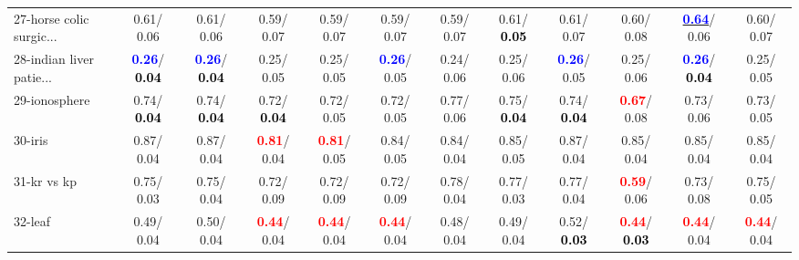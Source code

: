 \begin{table}[h]
\begin{center}
{\begin{tabular}{lc|c|c|c|c|c|c|c|c|c|c}
27-horse colic surgic... &   0.61/  0.06 &   0.61/  0.06 &   0.59/  0.07 &   0.59/  0.07 &   0.59/  0.07 &   0.59/  0.07 &   0.61/\textcolor{black}{\textbf{  0.05}} &   0.61/  0.07 &   0.60/  0.08 & \underline{\textcolor{blue}{\textbf{  0.64}}}/  0.06 &   0.60/  0.07 \\
28-indian liver patie... & \textcolor{blue}{\textbf{  0.26}}/\textcolor{black}{\textbf{  0.04}} & \textcolor{blue}{\textbf{  0.26}}/\textcolor{black}{\textbf{  0.04}} &   0.25/  0.05 &   0.25/  0.05 & \textcolor{blue}{\textbf{  0.26}}/  0.05 &   0.24/  0.06 &   0.25/  0.06 & \textcolor{blue}{\textbf{  0.26}}/  0.05 &   0.25/  0.06 & \textcolor{blue}{\textbf{  0.26}}/\textcolor{black}{\textbf{  0.04}} &   0.25/  0.05 \\ \hline
29-ionosphere &   0.74/\textcolor{black}{\textbf{  0.04}} &   0.74/\textcolor{black}{\textbf{  0.04}} &   0.72/\textcolor{black}{\textbf{  0.04}} &   0.72/  0.05 &   0.72/  0.05 &   0.77/  0.06 &   0.75/\textcolor{black}{\textbf{  0.04}} &   0.74/\textcolor{black}{\textbf{  0.04}} & \textcolor{red}{\textbf{  0.67}}/  0.08 &   0.73/  0.06 &   0.73/  0.05 \\
30-iris &   0.87/  0.04 &   0.87/  0.04 & \textcolor{red}{\textbf{  0.81}}/  0.04 & \textcolor{red}{\textbf{  0.81}}/  0.05 &   0.84/  0.05 &   0.84/  0.04 &   0.85/  0.05 &   0.87/  0.04 &   0.85/  0.04 &   0.85/  0.04 &   0.85/  0.04 \\
31-kr vs kp &   0.75/  0.03 &   0.75/  0.04 &   0.72/  0.09 &   0.72/  0.09 &   0.72/  0.09 &   0.78/  0.04 &   0.77/  0.03 &   0.77/  0.04 & \textcolor{red}{\textbf{  0.59}}/  0.06 &   0.73/  0.08 &   0.75/  0.05 \\
32-leaf &   0.49/  0.04 &   0.50/  0.04 & \textcolor{red}{\textbf{  0.44}}/  0.04 & \textcolor{red}{\textbf{  0.44}}/  0.04 & \textcolor{red}{\textbf{  0.44}}/  0.04 &   0.48/  0.04 &   0.49/  0.04 &   0.52/\textcolor{black}{\textbf{  0.03}} & \textcolor{red}{\textbf{  0.44}}/\textcolor{black}{\textbf{  0.03}} & \textcolor{red}{\textbf{  0.44}}/  0.04 & \textcolor{red}{\textbf{  0.44}}/  0.04 \\\end{tabular}}\label{stratsALCKappa0besta}
\end{center}
\end{table}
